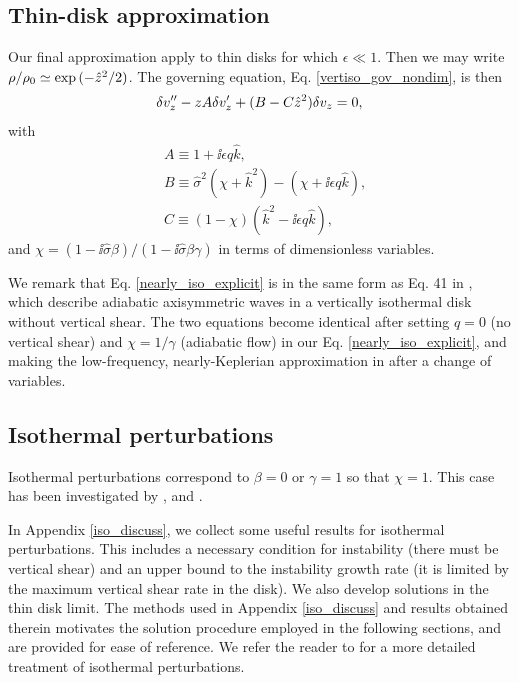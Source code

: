 \subsection{Thin-disk approximation}\label{analytic_relax}
Our final approximation apply to thin disks for 
which $\epsilon\ll 1$. Then we may write $\rho/\rho_0\simeq
\exp{(-\hat{z}^2/2)}$. The governing equation,
Eq. \ref{vertiso_gov_nondim}, is then   
\begin{align}
  \delta v_z^{\prime\prime} - z A\delta v_z^\prime +
  (B - C\hat{z}^2)\delta v_z = 0,\label{nearly_iso_explicit}
\end{align}
with
\begin{align}
  &A \equiv 1 + \ii \epsilon q \hat{k},\\
  &B \equiv \hat{\sigma}^2\left(\chi + \hat{k}^2\right) -
  \left(\chi + \ii \epsilon q \hat{k}\right),\\
  &C \equiv \left(1-\chi\right)\left(\hat{k}^2 - \ii
    \epsilon q\hat{k}\right), 
\end{align}
and $\chi =
\left(1-\ii\hat{\sigma}\beta\right)/\left(1-\ii\hat{\sigma}\beta\gamma\right)
$ in terms of dimensionless variables. 

We remark that Eq. \ref{nearly_iso_explicit} is in the same 
form as Eq. 41 in \cite{lubow93}, which describe adiabatic axisymmetric waves in
a vertically isothermal disk without vertical shear. The two equations
become identical after  setting $q=0$ (no vertical shear) and
$\chi=1/\gamma$ (adiabatic flow) in our Eq. \ref{nearly_iso_explicit},
and making the low-frequency, nearly-Keplerian approximation in
\citeauthor{lubow93} after a change of variables.    


\subsection{Isothermal perturbations}\label{iso_pert}
Isothermal perturbations correspond to $\beta = 0$ or $\gamma=1$ so 
that $\chi = 1$. This case has been investigated by \cite{nelson13},
\cite{mcnally14} and \cite{barker15}.  

In Appendix \ref{iso_discuss}, we collect some useful results for
isothermal  perturbations. This includes a necessary condition for
instability (there must be vertical shear) and an upper bound to the
instability growth rate (it is limited by the maximum vertical shear
rate in the disk). We also develop solutions in the thin disk
limit. The methods used in Appendix \ref{iso_discuss} and results obtained
therein motivates the solution procedure employed in the following
sections, and are provided for ease of reference. We refer the reader
to \cite{barker15} for a more detailed treatment of isothermal 
perturbations.   

